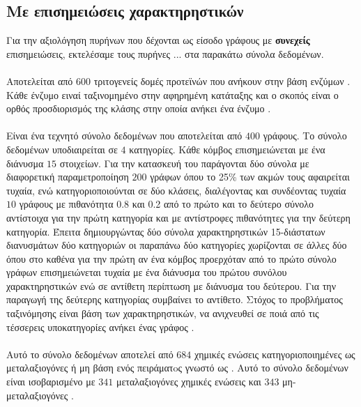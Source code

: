 \subsection{Με επισημειώσεις χαρακτηρηστικών}
Για την αξιολόγηση πυρήνων που δέχονται ως είσοδο γράφους με \textbf{συνεχείς} επισημειώσεις, εκτελέσαμε τους πυρήνες ... στα παρακάτω σύνολα δεδομένων.

\paragraph*{} Αποτελείται από $600$ τριτογενείς δομές προτεϊνών που ανήκουν στην βάση ενζύμων .
Κάθε ένζυμο ειναί ταξινομημένο στην αφηρημένη κατάταξης  και ο σκοπός είναι ο ορθός προσδιορισμός της κλάσης στην οποία ανήκει ένα ένζυμο \cite{Borgwardt2005}.

\paragraph*{} Είναι ένα τεχνητό σύνολο δεδομένων που αποτελείται από $400$ γράφους.
Το σύνολο δεδομένων υποδιαιρείται σε $4$ κατηγορίες.
Kάθε κόμβος επισημειώνεται με ένα διάνυσμα $15$ στοιχείων.
Για την κατασκευή του παράγονται δύο σύνολα με διαφορετική παραμετροποίηση $200$ γράφων  όπου το 25\% των ακμών τους αφαιρείται τυχαία, ενώ κατηγοριοποιούνται σε δύο κλάσεις, διαλέγοντας και συνδέοντας τυχαία $10$ γράφους με πιθανότητα 0.8 και 0.2 από το πρώτο και το δεύτερο σύνολο αντίστοιχα για την πρώτη κατηγορία και με αντίστροφες πιθανότητες για την δεύτερη κατηγορία.
Έπειτα δημιουργώντας δύο σύνολα χαρακτηρηστικών 15-διάστατων διανυσμάτων δύο κατηγοριών οι παραπάνω δύο κατηγορίες χωρίζονται σε άλλες δύο όπου στο καθένα για την πρώτη αν ένα κόμβος προερχόταν από το πρώτο σύνολο γράφων επισημειώνεται τυχαία με ένα διάνυσμα του πρώτου συνόλου χαρακτηρηστικών ενώ σε αντίθετη περίπτωση με διάνυσμα του δεύτερου.
Για την παραγωγή της δεύτερης κατηγορίας συμβαίνει το αντίθετο.
Στόχος το προβλήματος ταξινόμησης είναι βάση των χαρακτηρηστικών, να ανιχνευθεί σε ποιά από τις τέσσερεις υποκατηγορίες ανήκει ένας γράφος \cite{Morris16}.

\paragraph*{} Αυτό το σύνολο δεδομένων αποτελεί από $684$ χημικές ενώσεις κατηγοριοποιημένες ως μεταλαξιογόνες ή μη βάση ενός πειράματoς γνωστό ως .
Αυτό το σύνολο δεδομένων είναι ισοβαρισμένο με $341$ μεταλαξιογόνες χημικές ενώσεις και $343$ μη-μεταλαξιογόνες \cite{mahe2009graph, Neumann2016}.

